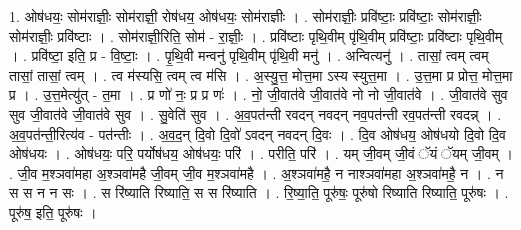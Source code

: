 \documentclass[17pt]{extarticle}
\begin{document}
1. ओष॑धयः॒ सोम॑राज्ञीः॒ सोम॑राज्ञी॒ रोष॑धय॒ ओष॑धयः॒ सोम॑राज्ञीः । . सोम॑राज्ञीः॒ प्रवि॑ष्टाः॒ प्रवि॑ष्टाः॒ सोम॑राज्ञीः॒ सोम॑राज्ञीः॒ प्रवि॑ष्टाः । . सोम॑राज्ञी॒रिति॒ सोम॑ - रा॒ज्ञीः॒ । . प्रवि॑ष्टाः पृथि॒वीम् पृ॑थि॒वीम् प्रवि॑ष्टाः॒ प्रवि॑ष्टाः पृथि॒वीम् । . प्रवि॑ष्टा॒ इति॒ प्र - वि॒ष्टाः॒ । . पृ॒थि॒वी मन्वनु॑ पृथि॒वीम् पृ॑थि॒वी मनु॑ । . अन्वित्यनु॑ । . तासां॒ त्वम् त्वम् तासां॒ तासां॒ त्वम् । . त्व म॑स्यसि॒ त्वम् त्व म॑सि । . अ॒स्यु॒त्त॒ मोत्त॒मा ऽस्य स्युत्त॒मा । . उ॒त्त॒मा प्र प्रोत्त॒ मोत्त॒मा प्र । . उ॒त्त॒मेत्यु॑त् - त॒मा । . प्र णो॑ नः॒ प्र प्र णः॑ । . नो॒ जी॒वात॑वे जी॒वात॑वे नो नो जी॒वात॑वे । . जी॒वात॑वे सुव सुव जी॒वात॑वे जी॒वात॑वे सुव । . सु॒वेति॑ सुव । . अ॒व॒पत॑न्ती रवदन् नवदन् नव॒पत॑न्ती रव॒पत॑न्ती रवदन्न् । . अ॒व॒पत॑न्ती॒रित्य॑व - पत॑न्तीः । . अ॒व॒द॒न् दि॒वो दि॒वो॑ ऽवदन् नवदन् दि॒वः । . दि॒व ओष॑धय॒ ओष॑धयो दि॒वो दि॒व ओष॑धयः । . ओष॑धयः॒ परि॒ पर्योष॑धय॒ ओष॑धयः॒ परि॑ । . परीति॒ परि॑ । . यम् जी॒वम् जी॒वं ॅयं ॅयम् जी॒वम् । . जी॒व म॒श्ञवा॑महा अ॒श्ञवा॑महै जी॒वम् जी॒व म॒श्ञवा॑महै । . अ॒श्ञवा॑महै॒ न नाश्ञवा॑महा अ॒श्ञवा॑महै॒ न । . न स स न न सः । . स रि॑ष्याति रिष्याति॒ स स रि॑ष्याति । . रि॒ष्या॒ति॒ पूरु॑षः॒ पूरु॑षो रिष्याति रिष्याति॒ पूरु॑षः । . पूरु॑ष॒ इति॒ पूरु॑षः । \newline
\end{document}
